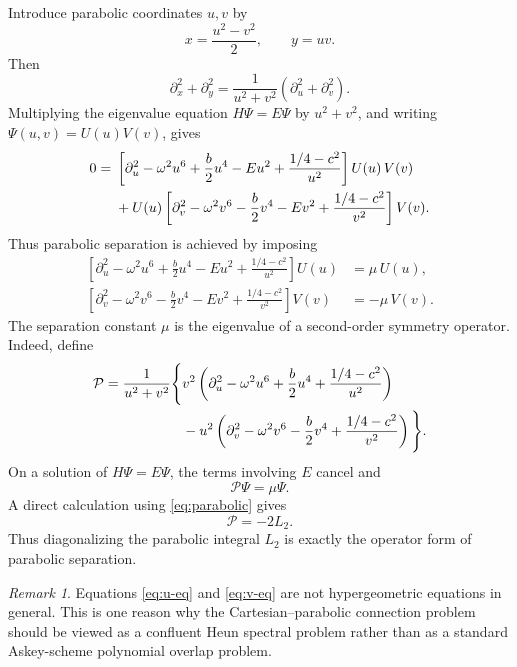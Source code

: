 \documentclass[11pt]{article}
\numberwithin{equation}{section}
\theoremstyle{definition}
\theoremstyle{remark}
\newtheorem{remark}[theorem]{Remark}
\newcommand{\cP}{\mathcal P}
\begin{document}
Introduce parabolic coordinates \(u,v\) by
\begin{equation}
        x=\frac{u^2-v^2}{2},\qquad y=uv.
        \label{eq:parabolic}
\end{equation}
Then
\begin{equation}
        \partial_x^2+\partial_y^2
        =
        \frac{1}{u^2+v^2}\left(\partial_u^2+\partial_v^2\right).
        \label{eq:lap-par}
\end{equation}
Multiplying the eigenvalue equation \(H\Psi=E\Psi\) by \(u^2+v^2\), and
writing \(\Psi(u,v)=U(u)V(v)\), gives
\begin{align}
0={}&
\left[
\partial_u^2
-\omega^2u^6+\frac b2u^4-Eu^2+\frac{1/4-c^2}{u^2}
\right]U(u)\,V(v)                                                   \notag\\
&+
U(u)\left[
\partial_v^2
-\omega^2v^6-\frac b2v^4-Ev^2+\frac{1/4-c^2}{v^2}
\right]V(v).
\label{eq:par-sep}
\end{align}
Thus parabolic separation is achieved by imposing
\begin{align}
\left[
\partial_u^2
-\omega^2u^6+\frac b2u^4-Eu^2+\frac{1/4-c^2}{u^2}
\right]U(u)&=\mu\,U(u),                                      \label{eq:u-eq}\\
\left[
\partial_v^2
-\omega^2v^6-\frac b2v^4-Ev^2+\frac{1/4-c^2}{v^2}
\right]V(v)&=-\mu\,V(v).                                    \label{eq:v-eq}
\end{align}
The separation constant \(\mu\) is the eigenvalue of a second-order symmetry
operator.  Indeed, define
\begin{align}
\cP=\frac{1}{u^2+v^2}
\Bigg\{&
v^2\left(
\partial_u^2-\omega^2u^6+\frac b2u^4+\frac{1/4-c^2}{u^2}
\right)                                                       \notag\\
&-
u^2\left(
\partial_v^2-\omega^2v^6-\frac b2v^4+\frac{1/4-c^2}{v^2}
\right)
\Bigg\}.
\label{eq:P}
\end{align}
On a solution of \(H\Psi=E\Psi\), the terms involving \(E\) cancel and
\[
        \cP\Psi=\mu\Psi.
\]
A direct calculation using \eqref{eq:parabolic} gives
\begin{equation}
        \cP=-2L_2.
        \label{eq:P-L2}
\end{equation}
Thus diagonalizing the parabolic integral \(L_2\) is exactly the operator
form of parabolic separation.

\begin{remark}
Equations \eqref{eq:u-eq} and \eqref{eq:v-eq} are not hypergeometric
equations in general.  This is one reason why the Cartesian--parabolic
connection problem should be viewed as a confluent Heun spectral problem
rather than as a standard Askey-scheme polynomial overlap problem.
\end{remark}
\end{document}
